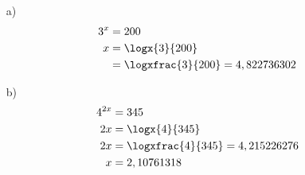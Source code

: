 \begin{antwoord}{15}
\begin{enumerate}
 \item[a)]
\begin{align*}
  3^x &= 200 \\
  x &= \logx{3}{200} \\
  &= \logxfrac{3}{200} = 4,822736302
\end{align*}
 \item[b)]
\begin{align*}
  4^{2x} &= 345 \\
  2x &= \logx{4}{345} \\
  2x &= \logxfrac{4}{345} = 4,215226276\\
  x &= 2,10761318
  \end{align*}
\end{enumerate}
\end{antwoord}

